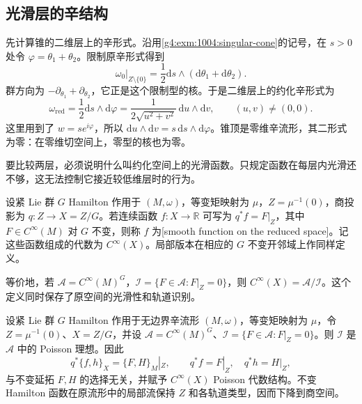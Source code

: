 \subsection{光滑层的辛结构}
\label{g4:subsec:1004:03}
先计算锥的二维层上的辛形式。沿用\cref{g4:exm:1004:singular-cone}的记号，在 \(s>0\) 处令 \(\varphi=\theta_1+\theta_2\)。限制原辛形式得到
\[
	\omega_0|_{Z\setminus\{0\}}
	=\frac12\mathrm{d}s\wedge(\mathrm{d}\theta_1+\mathrm{d}\theta_2).
\]
群方向为 \(-\partial_{\theta_1}+\partial_{\theta_2}\)，它正是这个限制型的核。于是二维层上的约化辛形式为
\begin{equation}\label{g4:eq:1004:cone-symplectic-form}
	\omega_{\mathrm{red}}=\frac12\mathrm{d}s\wedge\mathrm{d}\varphi
	=\frac1{2\sqrt{u^2+v^2}}\,\mathrm{d}u\wedge\mathrm{d}v,
	\qquad (u,v)\neq(0,0).
\end{equation}
这里用到了 \(w=se^{i\varphi}\)，所以 \(\mathrm{d}u\wedge\mathrm{d}v=s\,\mathrm{d}s\wedge\mathrm{d}\varphi\)。锥顶是零维辛流形，其二形式为零：在零维切空间上，零型的核也为零。

\ProseParagraphBreak

要比较两层，必须说明什么叫约化空间上的光滑函数。只规定函数在每层内光滑还不够，这无法控制它接近较低维层时的行为。

\begin{definition}\label{g4:def:1004:reduced-smooth-functions}
	设紧 Lie 群 \(G\) Hamilton 作用于 \((M,\omega)\)，等变矩映射为 \(\mu\)，\(Z=\mu^{-1}(0)\)，商投影为 \(q:Z\to X=Z/G\)。若连续函数 \(f:X\to\mathbb R\) 可写为 \(q^*f=F|_Z\)，其中 \(F\in C^\infty(M)\) 对 \(G\) 不变，则称 \(f\) 为[smooth function on the reduced space]。记这些函数组成的代数为 \(C^\infty(X)\)。局部版本在相应的 \(G\) 不变开邻域上作同样定义。
\end{definition}

等价地，若 \(\mathcal A=C^\infty(M)^G\)，\(\mathcal I=\{F\in\mathcal A:F|_Z=0\}\)，则 \(C^\infty(X)=\mathcal A/\mathcal I\)。这个定义同时保存了原空间的光滑性和轨道识别。

\begin{proposition}\label{g4:prop:1004:reduced-poisson}
	设紧 Lie 群 \(G\) Hamilton 作用于无边界辛流形 \((M,\omega)\)，等变矩映射为 \(\mu\)，令 \(Z=\mu^{-1}(0)\)、\(X=Z/G\)，并设 \(\mathcal A=C^\infty(M)^G\)、\(\mathcal I=\{F\in\mathcal A:F|_Z=0\}\)。则 \(\mathcal I\) 是 \(\mathcal A\) 中的 Poisson 理想。因此
	\begin{equation}\label{g4:eq:1004:reduced-poisson}
		q^*\{f,h\}_X=\{F,H\}_M|_Z,
		\qquad q^*f=F|_Z,\quad q^*h=H|_Z,
	\end{equation}
	与不变延拓 \(F,H\) 的选择无关，并赋予 \(C^\infty(X)\) Poisson 代数结构。不变 Hamilton 函数在原流形中的局部流保持 \(Z\) 和各轨道类型，因而下降到商空间。
\end{proposition}


